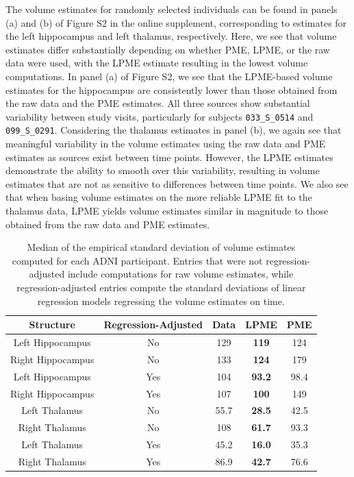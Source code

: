 \documentclass[12pt]{article}
\theoremstyle{definition}
\begin{document}
The volume estimates for randomly selected individuals can be found in panels (a) and (b) of Figure S2 in the online supplement, corresponding to estimates for the left hippocampus and left thalamus, respectively. Here, we see that volume estimates differ substantially depending on whether PME, LPME, or the raw data were used, with the LPME estimate resulting in the lowest volume computations. In panel (a) of Figure S2, we see that the LPME-based volume estimates for the hippocampus are consistently lower than those obtained from the raw data and the PME estimates. All three sources show substantial variability between study visits, particularly for subjects \texttt{033\_S\_0514} and \texttt{099\_S\_0291}. Considering the thalamus estimates in panel (b), we again see that meaningful variability in the volume estimates using the raw data and PME estimates as sources exist between time points. However, the LPME estimates demonstrate the ability to smooth over this variability, resulting in volume estimates that are not as sensitive to differences between time points. We also see that when basing volume estimates on the more reliable LPME fit to the thalamus data, LPME yields volume estimates similar in magnitude to those obtained from the raw data and PME estimates.

\begin{table}
  \centering
  \begin{tabular}{|c c c c c|}
    \hline
    Structure & Regression-Adjusted & Data & LPME & PME  \\
    \hline
    Left Hippocampus & No & 129 & \textbf{119} & 124 \\
    Right Hippocampus & No & 133 & \textbf{124} & 179 \\
    Left Hippocampus & Yes & 104 & \textbf{93.2} & 98.4 \\
    Right Hippocampus & Yes & 107 & \textbf{100} & 149 \\
    Left Thalamus & No & 55.7 & \textbf{28.5} & 42.5 \\
    Right Thalamus & No & 108 & \textbf{61.7} & 93.3 \\
    Left Thalamus & Yes & 45.2 & \textbf{16.0} & 35.3 \\
    Right Thalamus & Yes & 86.9 & \textbf{42.7} & 76.6 \\
    \hline
  \end{tabular}
  \caption{{\footnotesize Median of the empirical standard deviation of volume estimates computed for each ADNI participant. Entries that were not regression-adjusted include computations for raw volume estimates, while regression-adjusted entries compute the standard deviations of linear regression models regressing the volume estimates on time.} }
  \label{table:adni_volume_sds}
\end{table}
\end{document}
